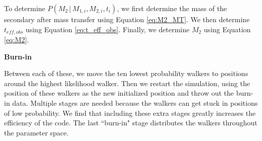 \documentclass[12pt, preprint]{aastex}
\newcommand{\given}{\,|\,}
\begin{document}
To determine $P(M_2 \given M_{1,i}, M_{2,i}, t_i )$, we first determine the mass of the secondary after mass transfer using Equation \ref{eq:M2_MT}. We then determine $t_{eff,obs}$ using Equation \ref{eq:t_eff_obs}. Finally, we determine $M_2$ using Equation \ref{eq:M2}.




{\bf Burn-in}


Between each of these, we move the ten lowest probability walkers to positions around the highest likelihood walker. Then we restart the simulation, using the position of these walkers as the new initialized position and throw out the burn-in data. Multiple stages are needed because the walkers can get stuck in positions of low probability. We find that including these extra stages greatly increases the efficiency of the code. The last ``burn-in" stage distributes the walkers throughout the parameter space. 
\end{document}
